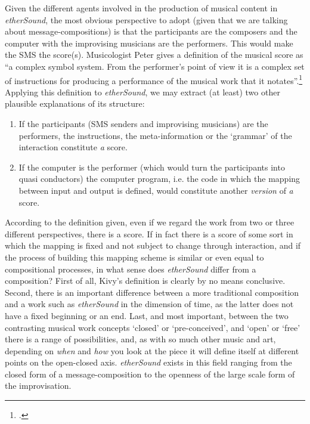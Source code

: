 Given the different agents involved in the production of musical content in \emph{etherSound}, the most obvious perspective to adopt (given that we are talking about message-compositions) is that the participants are the composers and the computer with the improvising musicians are the performers. This would make the SMS the score(s). Musicologist Peter \citeauthor{kivy02} gives a definition of the musical score as ``a complex symbol system. From the performer's point of view it is a complex set of instructions for producing a performance of the musical work that it notates''.\footcite[204]{kivy02} Applying this definition to \emph{etherSound}, we may extract (at least) two other plausible explanations of its structure:
%
\begin{enumerate} 
\item If the participants (SMS senders and improvising musicians) are the performers, the instructions, the meta-information or the `grammar' of the interaction constitute \emph{a} score. 
\item If the computer is the performer (which would turn the participants into quasi conductors) the computer program, i.e. the code in which the mapping between input and output is defined, would constitute another \emph{version} of \emph{a} score. \end{enumerate}
%
According to the definition given, even if we regard the work from two or three different perspectives, there is a score. 
If in fact there is a score of some sort in which the mapping is fixed and not subject to change through interaction, and if the process of building this mapping scheme is similar or even equal to compositional processes, in what sense does \emph{etherSound} differ from a composition? First of all, Kivy's definition is clearly by no means conclusive. Second, there is an important difference between a more traditional composition and a work such as \emph{etherSound} in the dimension of time, as the latter does not have a fixed beginning or an end. Last, and most important, between the two contrasting musical work concepts `closed' or `pre-conceived', and `open' or `free' there is a range of possibilities, and, as with so much other music and art, depending on \emph{when} and \emph{how} you look at the piece it will define itself at different points on the open-closed axis. \emph{etherSound} exists in this field ranging from the closed form of a message-composition to the openness of the large scale form of the improvisation. 

